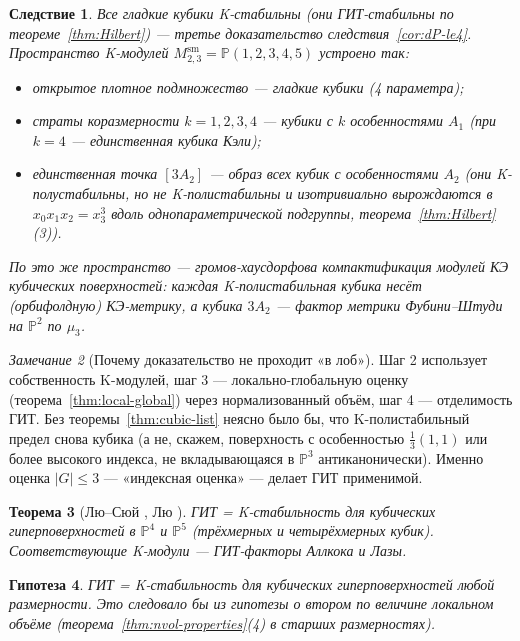 \documentclass[11pt,a4paper]{article}
\theoremstyle{plain}
\newtheorem{theorem}{Теорема}[section]
\newtheorem{corollary}[theorem]{Следствие}
\newtheorem{conjecture}[theorem]{Гипотеза}
\theoremstyle{definition}
\theoremstyle{remark}
\newtheorem{remark}[theorem]{Замечание}
\newcommand{\PP}{\mathbb{P}}
\newcommand{\sm}{\mathrm{sm}}
\begin{document}
\begin{corollary}\label{cor:cubic-moduli}
Все гладкие кубики K-стабильны (они ГИТ-стабильны по теореме~\ref{thm:Hilbert}) --- третье
доказательство следствия~\ref{cor:dP-le4}. Пространство K-модулей $M^{\sm}_{2,3}=\PP(1,2,3,4,5)$
устроено так:
\begin{itemize}
\item открытое плотное подмножество --- гладкие кубики (4 параметра);
\item страты коразмерности $k=1,2,3,4$ --- кубики с $k$ особенностями $A_1$ (при $k=4$ ---
единственная кубика Кэли);
\item единственная точка $[3A_2]$ --- образ всех кубик с особенностями $A_2$ (они K-полустабильны,
но не K-полистабильны и изотривиально вырождаются в $x_0x_1x_2=x_3^3$ вдоль однопараметрической
подгруппы, теорема~\ref{thm:Hilbert}(3)).
\end{itemize}
По \cite{OSS} это же пространство --- громов-хаусдорфова компактификация модулей КЭ кубических
поверхностей: каждая K-полистабильная кубика несёт (орбифолдную) КЭ-метрику, а кубика $3A_2$ ---
фактор метрики Фубини--Штуди на $\PP^2$ по $\mu_3$.
\end{corollary}

\begin{remark}[Почему доказательство не проходит «в лоб»]
Шаг 2 использует собственность K-модулей, шаг 3 --- локально-глобальную оценку
(теорема~\ref{thm:local-global}) через нормализованный объём, шаг 4 --- отделимость ГИТ. Без
теоремы~\ref{thm:cubic-list} неясно было бы, что K-полистабильный предел снова кубика (а не,
скажем, поверхность с особенностью $\frac13(1,1)$ или более высокого индекса, не вкладывающаяся в
$\PP^3$ антиканонически). Именно оценка $|G|\le3$ --- «индексная оценка» --- делает ГИТ
применимой.
\end{remark}

\begin{theorem}[{Лю--Сюй \cite{LX19}, Лю \cite{Liu22}}]
ГИТ = K-стабильность для кубических гиперповерхностей в $\PP^4$ и $\PP^5$ (трёхмерных и
четырёхмерных кубик). Соответствующие K-модули --- ГИТ-факторы Аллкока и Лазы.
\end{theorem}

\begin{conjecture}
ГИТ = K-стабильность для кубических гиперповерхностей любой размерности. Это следовало бы из
гипотезы о втором по величине локальном объёме (теорема~\ref{thm:nvol-properties}(4) в старших
размерностях).
\end{conjecture}
\end{document}
